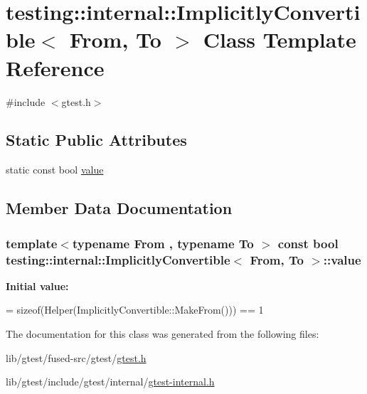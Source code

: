 \hypertarget{classtesting_1_1internal_1_1_implicitly_convertible}{\section{testing\-:\-:internal\-:\-:Implicitly\-Convertible$<$ From, To $>$ Class Template Reference}
\label{classtesting_1_1internal_1_1_implicitly_convertible}
}


{\ttfamily \#include $<$gtest.\-h$>$}

\subsection*{Static Public Attributes}
\begin{DoxyCompactItemize}
\item 
static const bool \hyperlink{classtesting_1_1internal_1_1_implicitly_convertible_aea51cecabca681fb75659e224771b7b7}{value}
\end{DoxyCompactItemize}


\subsection{Member Data Documentation}
\hypertarget{classtesting_1_1internal_1_1_implicitly_convertible_aea51cecabca681fb75659e224771b7b7}{
\subsubsection[{value}]{\setlength{\rightskip}{0pt plus 5cm}template$<$typename From , typename To $>$ const bool {\bf testing\-::internal\-::\-Implicitly\-Convertible}$<$ From, {\bf To} $>$\-::value\hspace{0.3cm}{\ttfamily [static]}}}\label{classtesting_1_1internal_1_1_implicitly_convertible_aea51cecabca681fb75659e224771b7b7}
{\bfseries Initial value\-:}
\begin{DoxyCode}
=
      \textcolor{keyword}{sizeof}(Helper(ImplicitlyConvertible::MakeFrom())) == 1
\end{DoxyCode}


The documentation for this class was generated from the following files\-:\begin{DoxyCompactItemize}
\item 
lib/gtest/fused-\/src/gtest/\hyperlink{fused-src_2gtest_2gtest_8h}{gtest.\-h}\item 
lib/gtest/include/gtest/internal/\hyperlink{gtest-internal_8h}{gtest-\/internal.\-h}\end{DoxyCompactItemize}
